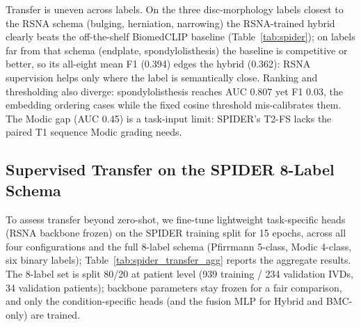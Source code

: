 \documentclass[runningheads]{llncs}
\begin{document}
Transfer is uneven across labels. On the three disc-morphology labels closest to the RSNA schema (bulging, herniation, narrowing) the RSNA-trained hybrid clearly beats the off-the-shelf BiomedCLIP baseline (Table~\ref{tab:spider}); on labels far from that schema (endplate, spondylolisthesis) the baseline is competitive or better, so its all-eight mean F1 (0.394) edges the hybrid (0.362): RSNA supervision helps only where the label is semantically close. Ranking and thresholding also diverge: spondylolisthesis reaches AUC 0.807 yet F1 0.03, the embedding ordering cases while the fixed cosine threshold mis-calibrates them. The Modic gap (AUC 0.45) is a task-input limit: SPIDER's T2-FS lacks the paired T1 sequence Modic grading needs.

\subsection{Supervised Transfer on the SPIDER 8-Label Schema}
\label{sec:spider_transfer}

To assess transfer beyond zero-shot, we fine-tune lightweight task-specific heads (RSNA backbone frozen) on the SPIDER training split for 15 epochs, across all four configurations and the full 8-label schema (Pfirrmann 5-class, Modic 4-class, six binary labels); Table~\ref{tab:spider_transfer_agg} reports the aggregate results. The 8-label set is split 80/20 at patient level (939 training / 234 validation IVDs, 34 validation patients); backbone parameters stay frozen for a fair comparison, and only the condition-specific heads (and the fusion MLP for Hybrid and BMC-only) are trained.
\end{document}

